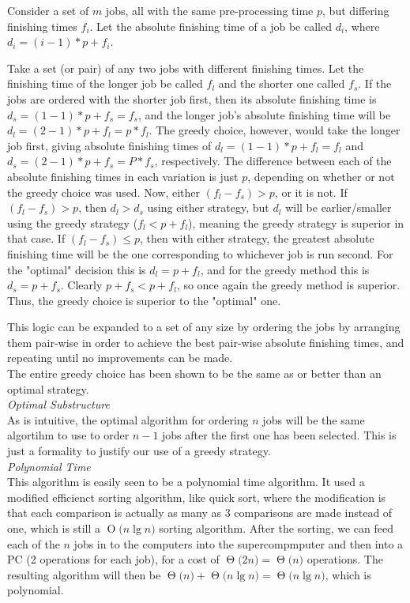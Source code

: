 \documentclass[11pts]{article}
\newcommand{\BigO}[1]{\ensuremath{\operatorname{O}\bigl(#1\bigr)}}
\newcommand{\BigTheta}[1]{\ensuremath{\operatorname{\Theta}\bigl(#1\bigr)}}
\begin{document}
\begin{enumerate}
  Consider a set of $m$ jobs, all with the same pre-processing time $p$,
  but differing finishing times $f_i$. Let the absolute finishing time of
  a job be called $d_i$, where $d_i = (i - 1) * p + f_i$.

  Take a set (or pair) of any two jobs with different finishing times. Let
  the finishing time of the longer job be called $f_l$ and the shorter one
  called $f_s$. If the jobs are ordered with the shorter job first, then its
  absolute finishing time is $d_s = (1 - 1) * p + f_s = f_s$, and the longer
  job's absolute finishing time will be $d_l = (2 - 1) * p + f_l = p * f_l$.
  The greedy choice, however, would take the longer job first, giving absolute
  finishing times of $d_l = (1 - 1) * p + f_l = f_l$ and
  $d_s = (2 - 1) * p + f_s = P * f_s$, respectively. The difference
  between each of the absolute finishing times in each variation is just $p$,
  depending on whether or not the greedy choice was used. Now, either
  $(f_l - f_s) > p$, or it is not. If $(f_l - f_s) > p$, then $d_l > d_s$
  using either strategy, but $d_l$ will be earlier/smaller using the
  greedy strategy ($f_l < p + f_l$), meaning the greedy strategy is superior
  in that case. If $(f_l - f_s) \le p$, then with either strategy,
  the greatest absolute finishing time will be the one corresponding
  to whichever job is run second. For the "optimal" decision this
  is $d_l = p + f_l$, and for the greedy method this is $d_s = p + f_s$.
  Clearly $p + f_s < p + f_l$, so once again the greedy method is superior.
  Thus, the greedy choice is superior to the "optimal" one.

  This logic can be expanded to a set of any size by ordering the jobs
  by arranging
  them pair-wise in order to achieve the best pair-wise absolute
  finishing times, and repeating until no improvements can be made. \\

  The entire greedy choice has been shown to be the same as or better than an
  optimal strategy. \\

  \textit{Optimal Substructure} \\
  As is intuitive, the optimal algorithm for ordering $n$ jobs will be the
  same algortihm to use to order $n-1$ jobs after the first one has been
  selected. This is just a formality to justify our use of a greedy strategy. \\ 

  \textit{Polynomial Time} \\
  This algorithm is easily seen to be a polynomial time algorithm. It used
  a modified efficienct sorting algorithm, like quick sort, where the
  modification is that each comparison is actually as many as
  $3$ comparisons are made instead of one,
  which is still a \BigO{n\lg{n}} sorting algorithm. After the sorting, we
  can feed each of the $n$ jobs in to the computers into the supercompmputer
  and then into a PC (2 operations for each job), for a cost of
  $\BigTheta{2n} = \BigTheta{n}$ operations. The resulting algorithm will
  then be $\BigTheta{n} + \BigTheta{n\lg{n}} = \BigTheta{n\lg{n}}$, which
  is polynomial. \\


\end{enumerate}
\end{document}
